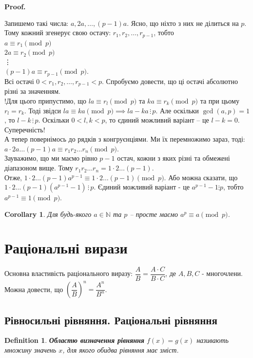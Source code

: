 \documentclass[a4paper, 10pt]{article}
\makeatletter
\def\qed{$\blacksquare$}
\theoremstyle{theoremdd}
\theoremstyle{theoremdd}
\newtheorem{definition}[theorem]{Definition}
\theoremstyle{theoremdd}
\theoremstyle{theoremdd}
\theoremstyle{theoremdd}
\theoremstyle{theoremdd}
\theoremstyle{theoremdd}
\theoremstyle{theoremdd}
\newtheorem{corollary}[theorem]{Corollary}
\renewenvironment{proof}[1][Proof.\\]{\par
\pushQED{\hfill \qed}%
\normalfont \topsep6\p@\@plus6\p@\relax
\trivlist
\item\relax
{\bfseries
#1\@addpunct{.}}\hspace\labelsep\ignorespaces
}{%
\popQED\endtrivlist\@endpefalse
}
\newcommand\divisibleBy{\, \vdots \,}
\makeatother
\begin{document}
\begin{proof}
Запишемо такі числа: $a,2a,\dots,(p-1)a$. Ясно, що ніхто з них не ділиться на $p$. Тому кожний згенерує свою остачу: $r_1,r_2,\dots,r_{p-1}$, тобто\\
$a \equiv r_1 \pmod p$\\
$2a \equiv r_2 \pmod p$\\
\vdots \\
$(p-1)a \equiv r_{p-1} \pmod p$.\\
Всі остачі $0 < r_1,r_2,\dots,r_{p-1} < p$. Спробуємо довести, що ці остачі абсолютно різні за значенням.\\
!Для цього припустимо, що $la \equiv r_l \pmod p$ та $ka \equiv r_k \pmod p$ та при цьому $r_l = r_k$. Тоді звідси $la \equiv ka \pmod p \implies la-ka \divisibleBy p$. Але оскільки $\gcd(a,p) = 1$, то $l-k \divisibleBy p$. Оскільки $0 < l,k < p$, то єдиний можливий варіант -- це $l-k=0$. Суперечність!\\
А тепер повернімось до рядків з конгруєнціями. Ми їх перемножимо зараз, тоді:\\
$a \cdot 2a \dots (p-1)a \equiv r_1 r_2 \dots r_n \pmod p$.\\
Зауважимо, що ми маємо рівно $p-1$ остач, кожни з яких різні та обмежені діапазоном вище. Тому $r_1r_2 \dots r_n = 1\cdot 2 \dots (p-1)$.\\
Отже, $1 \cdot 2 \dots (p-1) a^{p-1} \equiv 1 \cdot 2 \dots (p-1) \pmod p$. Або можна сказати, що $1 \cdot 2 \dots (p-1)(a^{p-1}-1) \divisibleBy p$. Єдиний можливий варіант - це $a^{p-1}-1 \vdots p$, тобто $a^{p-1} \equiv 1 \pmod p$.
\end{proof}

\begin{corollary}
Для будь-якого $a \in \mathbb{N}$ та $p$ -- просте маємо $a^{p} \equiv a \pmod p$.
\end{corollary}
\newpage

\section{Раціональні вирази}
Основна властивість раціонального виразу: $\dfrac{A}{B} = \dfrac{A \cdot C}{B \cdot C}$, де $A,B,C$ - многочлени.\\
Можна довести, що $\left( \dfrac{A}{B} \right)^n = \dfrac{A^n}{B^n}$.

\subsection{Рівносильні рівняння. Раціональні рівняння}
\begin{definition}
\textbf{Областю визначення рівняння} $f(x) = g(x)$ називають множину значень $x$, для якого обидва рівняння має зміст.
\end{definition}
\end{document}
